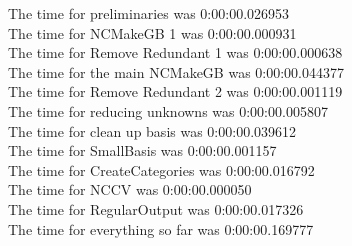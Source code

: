 \documentclass[rep10,leqno]{report}
\begin{document}
\noindent
The time for preliminaries was 0:00:00.026953\\
The time for NCMakeGB 1 was 0:00:00.000931\\
The time for Remove Redundant 1 was 0:00:00.000638\\
The time for the main NCMakeGB was 0:00:00.044377\\
The time for Remove Redundant 2 was 0:00:00.001119\\
The time for reducing unknowns was 0:00:00.005807\\
The time for clean up basis was 0:00:00.039612\\
The time for SmallBasis was 0:00:00.001157\\
The time for CreateCategories was 0:00:00.016792\\
The time for NCCV was 0:00:00.000050\\
The time for RegularOutput was 0:00:00.017326\\
The time for everything so far was 0:00:00.169777\\
\end{document}
